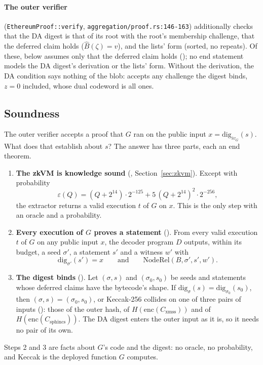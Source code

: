 \documentclass[11pt]{article}
\newcommand{\Cx}{C_{\mathrm{xmss}}}
\newcommand{\Cs}{C_{\mathrm{sphincs}}}
\newcommand{\enc}{\mathrm{enc}}
\begin{document}
\paragraph{The outer verifier} (\texttt{EthereumProof::verify}, \texttt{aggregation/proof.rs:146-163})
additionally checks that the DA digest is that of its root with the root's membership
challenge, that the deferred claim holds ($\widehat{B}(\zeta) = v$), and the lists' form
(sorted, no repeats). Of these,  below
assumes only that the deferred claim holds (); no end statement
models the DA digest's derivation or the lists' form. Without the derivation, the DA condition says
nothing of the blob:  accepts any challenge the digest binds, $z = 0$
included, whose dual codeword is all ones.

\subsection{Soundness}

The outer verifier accepts a proof that $G$ ran on the public input $x = \mathrm{dig}_{iv_G}(s)$.
What does that establish about $s$? The answer has three parts, each an end theorem.
\begin{enumerate}
\item \textbf{The zkVM is knowledge sound} (,
Section~\ref{sec:zkvm}). Except with probability
\[
\varepsilon(Q) = (Q+2^{14})\cdot 2^{-125} + 5\,(Q+2^{14})^2\cdot 2^{-256},
\]
the extractor returns a valid execution $t$ of $G$ on $x$. This is the only step with an oracle
and a probability.
\item \textbf{Every execution of $G$ proves a statement} (). From
every valid execution $t$ of $G$ on any public input $x$, the decoder program $D$ outputs, within
its budget, a seed $\sigma'$, a statement $s'$ and a witness $w'$ with
\[
\mathrm{dig}_{\sigma'}(s') = x \qquad\text{and}\qquad \mathrm{NodeRel}(B, \sigma', s', w').
\]
\item \textbf{The digest binds} (). Let $(\sigma, s)$ and $(\sigma_0, s_0)$
be seeds and statements whose deferred claims have the bytecode's shape. If
$\mathrm{dig}_\sigma(s) = \mathrm{dig}_{\sigma_0}(s_0)$, then $(\sigma, s) = (\sigma_0, s_0)$, or
Keccak-256 collides on one of three pairs of inputs (): those of the
outer hash, of $H(\enc(\Cx))$ and of $H(\enc(\Cs))$. The DA digest enters the outer input as it
is, so it needs no pair of its own.
\end{enumerate}
Steps 2 and 3 are facts about $G$'s code and the digest: no oracle, no probability, and Keccak is
the deployed function $G$ computes.
\end{document}
